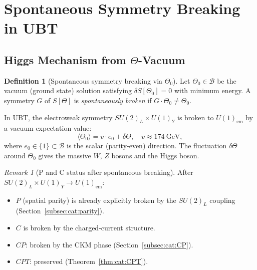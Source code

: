 \documentclass[12pt,a4paper]{article}
\theoremstyle{definition}
\newtheorem{definition}[theorem]{Definition}
\theoremstyle{remark}
\newtheorem{remark}[theorem]{Remark}
\begin{document}
\section{Spontaneous Symmetry Breaking in UBT}
\label{sec:cat:spontaneous}

\subsection{Higgs Mechanism from $\Theta$-Vacuum}
\label{subsec:cat:higgs}

\begin{definition}[Spontaneous symmetry breaking via $\Theta_0$]
\label{def:cat:Higgs}
Let $\Theta_0 \in \mathcal{B}$ be the vacuum (ground state) solution satisfying
$\delta S[\Theta_0] = 0$ with minimum energy.
A symmetry $G$ of $S[\Theta]$ is \emph{spontaneously broken} if
$G \cdot \Theta_0 \neq \Theta_0$.

In UBT, the electroweak symmetry $SU(2)_L \times U(1)_Y$ is broken to
$U(1)_{\mathrm{em}}$ by a vacuum expectation value:
\begin{equation}
  \langle\Theta_0\rangle = v \cdot e_0 + \delta\Theta,
  \quad v \approx 174\ \mathrm{GeV},
  \label{eq:cat:vev}
\end{equation}
where $e_0 \in \{1\} \subset \mathcal{B}$ is the scalar (parity-even) direction.
The fluctuation $\delta\Theta$ around $\Theta_0$ gives the massive $W$, $Z$
bosons and the Higgs boson.
\end{definition}

\begin{remark}[P and C status after spontaneous breaking]
After $SU(2)_L \times U(1)_Y \to U(1)_{\mathrm{em}}$:
\begin{itemize}
  \item $P$ (spatial parity) is already explicitly broken by the
    $SU(2)_L$ coupling (Section~\ref{subsec:cat:parity}).
  \item $C$ is broken by the charged-current structure.
  \item $CP$: broken by the CKM phase (Section~\ref{subsec:cat:CP}).
  \item $CPT$: preserved (Theorem~\ref{thm:cat:CPT}).
\end{itemize}
\end{remark}

\end{document}
